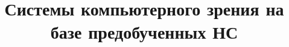\documentclass[10pt]{beamer}
\institute[]{Брестский государственный технический университет}
\title[]{\textbf{Системы компьютерного зрения на базе предобученных НС}}
\date{}
\begin{document}
	\begin{frame}
		\titlepage
	\end{frame}

\end{document}
